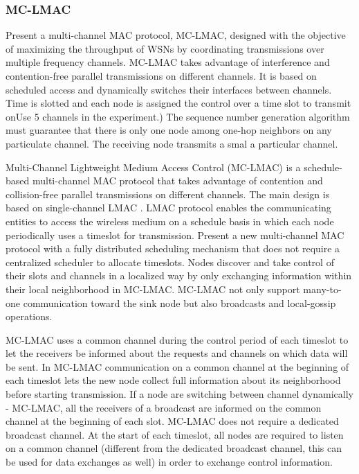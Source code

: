 \subsubsection{MC-LMAC}
Present a multi-channel MAC protocol, MC-LMAC, designed with the objective of maximizing the throughput of WSNs by coordinating transmissions over multiple frequency channels. MC-LMAC takes advantage of interference and contention-free parallel transmissions on different channels. It is based on scheduled access and dynamically switches their interfaces between channels. Time is slotted and each node is assigned the control over a time slot to transmit onUse 5 channels in the experiment.) The sequence number generation algorithm must guarantee that there is only one node among one-hop neighbors on any particulate channel. The receiving node transmits a smal a particular channel. 

Multi-Channel Lightweight Medium Access Control (MC-LMAC) is a schedule-based multi-channel MAC protocol that takes advantage of contention and collision-free parallel transmissions on different channels. The main design is based on single-channel LMAC \cite{lmac}. LMAC protocol enables the communicating entities to access the wireless medium on a schedule basis in which each node periodically uses a timeslot for transmission. Present a new multi-channel MAC protocol with a fully distributed scheduling mechanism that does not require a centralized scheduler to allocate timeslots. Nodes discover and take control of their slots and channels in a localized way by only exchanging information within their local neighborhood in MC-LMAC. MC-LMAC not only support many-to-one communication toward the sink node but also broadcasts and local-gossip operations. 

MC-LMAC uses a common channel during the control period of each timeslot to let the receivers be informed about the requests and channels on which data will be sent. In MC-LMAC communication on a common channel at the beginning of each timeslot lets the new node collect full information about its neighborhood before starting transmission. If a node are switching between channel dynamically - MC-LMAC, all the receivers of a broadcast are informed on the common channel at the beginning of each slot. MC-LMAC does not require a dedicated broadcast channel. At the start of each timeslot, all nodes are required to listen on a common channel (different from the dedicated broadcast channel, this can be used for data exchanges as well) in order to exchange control information. 


